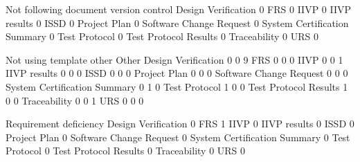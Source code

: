 \documentclass{article}
\begin{document}
\begin{Schunk}
\begin{Soutput}
                               Not following document version control
  Design Verification                                               0
  FRS                                                               0
  IIVP                                                              0
  IIVP results                                                      0
  ISSD                                                              0
  Project Plan                                                      0
  Software Change Request                                           0
  System Certification Summary                                      0
  Test Protocol                                                     0
  Test Protocol Results                                             0
  Traceability                                                      0
  URS                                                               0
                              
                               Not using template other Other
  Design Verification                           0     0     9
  FRS                                           0     0     0
  IIVP                                          0     0     1
  IIVP results                                  0     0     0
  ISSD                                          0     0     0
  Project Plan                                  0     0     0
  Software Change Request                       0     0     0
  System Certification Summary                  0     1     0
  Test Protocol                                 1     0     0
  Test Protocol Results                         1     0     0
  Traceability                                  0     0     1
  URS                                           0     0     0
                              
                               Requirement deficiency
  Design Verification                               0
  FRS                                               1
  IIVP                                              0
  IIVP results                                      0
  ISSD                                              0
  Project Plan                                      0
  Software Change Request                           0
  System Certification Summary                      0
  Test Protocol                                     0
  Test Protocol Results                             0
  Traceability                                      0
  URS                                               0
\end{Soutput}
\end{Schunk}
\end{document}
